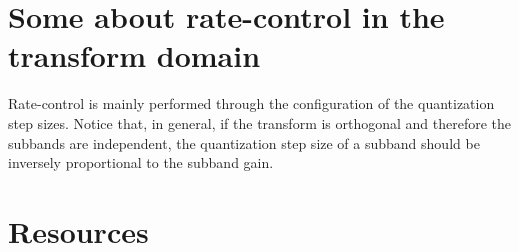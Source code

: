 
\section{Some about rate-control in the transform domain}

Rate-control is mainly performed through the configuration of the
quantization step sizes. Notice that, in general, if the transform is
orthogonal and therefore the subbands are independent, the
quantization step size of a subband should be inversely proportional
to the subband gain.


\section{Resources}


